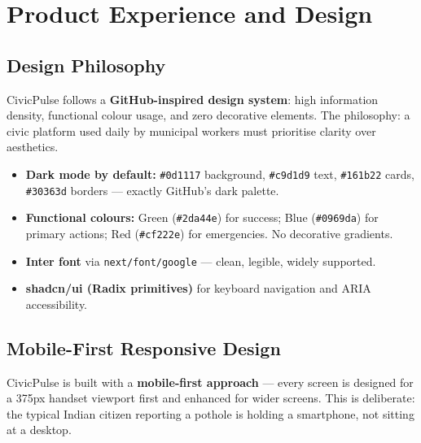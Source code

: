 \documentclass[11pt,a4paper]{article}
\newcommand{\tech}[1]{\texttt{\color{cpteal}#1}}
\begin{document}
\clearpage

\section{Product Experience and Design}
\label{sec:design}

\subsection{Design Philosophy}

CivicPulse follows a \textbf{GitHub-inspired design system}: high information density, functional colour usage, and zero decorative elements. The philosophy: a civic platform used daily by municipal workers must prioritise clarity over aesthetics.

\begin{itemize}
  \item \textbf{Dark mode by default:} \tech{\#0d1117} background, \tech{\#c9d1d9} text, \tech{\#161b22} cards, \tech{\#30363d} borders — exactly GitHub's dark palette.
  \item \textbf{Functional colours:} Green (\tech{\#2da44e}) for success; Blue (\tech{\#0969da}) for primary actions; Red (\tech{\#cf222e}) for emergencies. No decorative gradients.
  \item \textbf{Inter font} via \tech{next/font/google} — clean, legible, widely supported.
  \item \textbf{shadcn/ui (Radix primitives)} for keyboard navigation and ARIA accessibility.
\end{itemize}

\subsection{Mobile-First Responsive Design}

CivicPulse is built with a \textbf{mobile-first approach} — every screen is designed for a 375px handset viewport first and enhanced for wider screens. This is deliberate: the typical Indian citizen reporting a pothole is holding a smartphone, not sitting at a desktop.
\end{document}
